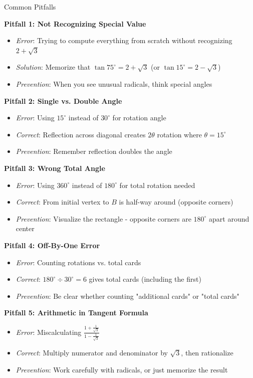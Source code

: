 \documentclass[12pt]{article}
\begin{document}
\begin{warningbox}{Common Pitfalls}

\textbf{Pitfall 1: Not Recognizing Special Value}
\begin{itemize}
    \item \textit{Error}: Trying to compute everything from scratch without recognizing $2+\sqrt{3}$
    \item \textit{Solution}: Memorize that $\tan 75^\circ = 2+\sqrt{3}$ (or $\tan 15^\circ = 2-\sqrt{3}$)
    \item \textit{Prevention}: When you see unusual radicals, think special angles
\end{itemize}

\textbf{Pitfall 2: Single vs. Double Angle}
\begin{itemize}
    \item \textit{Error}: Using $15^\circ$ instead of $30^\circ$ for rotation angle
    \item \textit{Correct}: Reflection across diagonal creates $2\theta$ rotation where $\theta = 15^\circ$
    \item \textit{Prevention}: Remember reflection doubles the angle
\end{itemize}

\textbf{Pitfall 3: Wrong Total Angle}
\begin{itemize}
    \item \textit{Error}: Using $360^\circ$ instead of $180^\circ$ for total rotation needed
    \item \textit{Correct}: From initial vertex to $B$ is half-way around (opposite corners)
    \item \textit{Prevention}: Visualize the rectangle - opposite corners are $180^\circ$ apart around center
\end{itemize}

\textbf{Pitfall 4: Off-By-One Error}
\begin{itemize}
    \item \textit{Error}: Counting rotations vs. total cards
    \item \textit{Correct}: $180^\circ \div 30^\circ = 6$ gives total cards (including the first)
    \item \textit{Prevention}: Be clear whether counting "additional cards" or "total cards"
\end{itemize}

\textbf{Pitfall 5: Arithmetic in Tangent Formula}
\begin{itemize}
    \item \textit{Error}: Miscalculating $\frac{1 + \frac{1}{\sqrt{3}}}{1 - \frac{1}{\sqrt{3}}}$
    \item \textit{Correct}: Multiply numerator and denominator by $\sqrt{3}$, then rationalize
    \item \textit{Prevention}: Work carefully with radicals, or just memorize the result
\end{itemize}

\end{warningbox}
\end{document}
